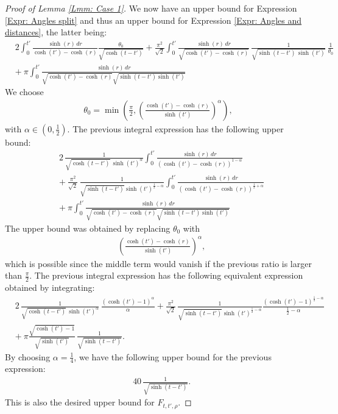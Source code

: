 \documentclass[11pt,twoside,reqno]{amsart} \usepackage{a4wide} \usepackage[T1]{fontenc} \usepackage[utf8]{inputenc} \usepackage{soul}  \usepackage{amsmath} \usepackage{amsfonts} \usepackage{amssymb} \usepackage{mathtools} \usepackage{amsthm} \usepackage{xcolor} \usepackage{graphicx} \usepackage{hyperref} \usepackage{standalone} \usepackage{esint} \usepackage{comment} \usepackage[left=2.3cm,top=3cm,right=2.3cm]{geometry} \usepackage{bm} \usepackage{svg} \usepackage{float} \numberwithin{equation}{section} \theoremstyle{plain} \newtheorem{thm}{Theorem}[section] \newtheorem{theorem}[thm]{Theorem} \newtheorem*{theorem*}{Theorem}\newtheorem{conj}[thm]{Conjecture} \newtheorem{lemma}[thm]{Lemma} \newtheorem{prop}[thm]{Proposition} \newtheorem{proposition}[thm]{Proposition} \newtheorem{cor}[thm]{Corollary} \newtheorem{question}[thm]{Question} \newtheorem{corollary}[thm]{Corollary} \newtheorem{assumption}[thm]{Assumption} \theoremstyle{definition} \newtheorem{defn}[thm]{Definition} \newtheorem{choice}[thm]{Choice} \newtheorem{definition}[thm]{Definition} \newtheorem{ex}[thm]{Example} \newtheorem{notation}[thm]{Notation} \newtheorem*{ack}{Acknowledgements} \theoremstyle{remark} \newtheorem{remark}[thm]{Remark} \newtheorem{bigremark}[thm]{Remark} \usepackage{xcolor} \newcommand{\red}[1]{ {\color{Red}#1} } \newcommand{\blue}[1]{ {\color{Blue}#1} } \author{Kai Hippi} \address{Aalto University, Espoo, Finland} \email{kai.hippi@aalto.fi}
\begin{document}
\begin{proof}[Proof of Lemma \ref{Lmm: Case 1}]
	We now have an upper bound for Expression \eqref{Expr: Angles split} and thus an upper bound for Expression \eqref{Expr: Angles and distances}, the latter being:
	\begin{align*}
		&
		2 \int_{0}^{t'} \frac{\sinh( r ) \, dr}{ \cosh( t' ) - \cosh( r ) } \frac{\theta_{0}}{ \sqrt{ \cosh( t-t' ) }  } + \frac{\pi^{2}}{\sqrt{2}} \int_{0}^{t'} \frac{ \sinh( r ) \, dr }{ \sqrt{ \cosh( t' ) - \cosh( r ) } } \, \frac{1}{ \sqrt{ \sinh( t - t' ) \, \sinh( t' ) } } \, \frac{1}{\theta_{0}} 
		\\
		& + \
		\pi \int_{0}^{t'} \frac{ \sinh( r ) \, dr }{\sqrt{ \cosh( t' ) - \cosh( r ) } \sqrt{  \sinh( t-t' ) \sinh( t' )  }}
	\end{align*}
	We choose
	\begin{align*}
		\theta_{0} = \min\left( \frac{\pi}{2} , \left( \frac{ \cosh( t' ) - \cosh( r ) }{ \sinh( t' ) } \right)^{\alpha} \right),
	\end{align*}
	with $ \alpha \in ( 0, \frac{1}{2} ) $. The previous integral expression has the following upper bound:
	\begin{align*}
		&
	2 \, \frac{1}{ \sqrt{ \cosh( t - t' ) } \, \sinh( t' )^{ \alpha }} \int_{0}^{t'} \frac{ \sinh( r ) \, dr }{ ( \cosh( t' ) - \cosh( r ) )^{ 1 - \alpha } } 
	\\
		& + \ 
		\frac{\pi^{2}}{\sqrt{2}} \,  \frac{ 1 }{ \sqrt{ \sinh( t - t' ) }  \sinh( t' )^{ \frac{1}{2} - \alpha }  } \int_{0}^{t'}\frac{ \sinh( r ) \, dr }{ ( \cosh( t' ) - \cosh( r ) )^{ \frac{1}{2} + \alpha } }
		\\
		& + \
		\pi \int_{0}^{t'} \frac{ \sinh( r ) \, dr }{\sqrt{ \cosh( t' ) - \cosh( r ) } \sqrt{  \sinh( t-t' ) \sinh( t' )  }}
	\end{align*}
	The upper bound was obtained by replacing $ \theta_{0} $ with 
	\begin{align*}
		&
		\left( \frac{ \cosh( t' ) - \cosh( r ) }{ \sinh( t' ) } \right)^{\alpha}, 
	\end{align*}
	which is possible since the middle term would vanish if the previous ratio is larger than $ \frac{\pi}{2} $. The previous integral expression has the following equivalent expression obtained by integrating:
	\begin{align*}
		&
		2 \, \frac{1}{ \sqrt{ \cosh( t - t' ) } \, \sinh( t' )^{ \alpha }} \, \frac{ ( \cosh( t' ) - 1 )^{\alpha} }{ \alpha } + \frac{\pi^{2}}{\sqrt{2}} \,  \frac{ 1 }{ \sqrt{ \sinh( t - t' ) }  \sinh( t' )^{ \frac{1}{2} - \alpha }  } \frac{ ( \cosh( t' ) - 1 )^{ \frac{1}{2} - \alpha } }{ \frac{1}{2} - \alpha }
		\\
		& + \
		\pi \frac{ \sqrt{ \cosh( t' ) - 1 } }{ \sqrt{ \sinh( t' ) } } \, \frac{1}{\sqrt{ \sinh( t-t' ) }}.
	\end{align*}
	By choosing $ \alpha = \frac{1}{4} $, we have the following upper bound for the previous expression:
	\begin{align*}
		&
		40 \, \frac{1}{\sqrt{ \sinh( t - t' ) }}.	
	\end{align*}
	This is also the desired upper bound for $ F_{t,t',\rho} $.

\end{proof}
\end{document}
